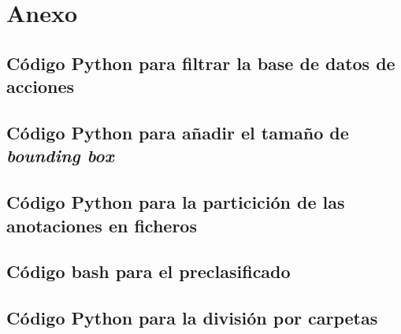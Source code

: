 \documentclass[12pt]{report} %
\begin{document}

    \chapter*{Anexo}
    \label{anexo}

    \section*{Código Python para filtrar la base de datos de acciones}
    \label{filtrado_script}
    

    \section*{Código Python para añadir el tamaño de \textit{bounding box}}
    \label{mod_ball}
    

    \section*{Código Python para la particición de las anotaciones en ficheros}
    

    \section*{Código bash para el preclasificado}
    \label{preclasificado}
    

    \section*{Código Python para la división por carpetas}
    \label{div_carpetas}
    
\end{document}
